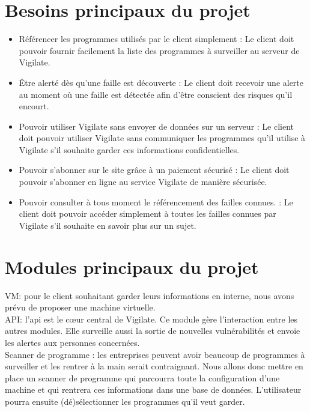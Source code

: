 \section{Besoins principaux du projet}
\begin{itemize}
\item Référencer les programmes utilisés par le client simplement : Le client doit pouvoir fournir facilement la liste des programmes à surveiller au serveur de Vigilate.
\item Être alerté dès qu'une faille est découverte : Le client doit recevoir une alerte au moment où une faille est détectée afin d'être conscient des risques qu'il encourt.
\item Pouvoir utiliser Vigilate sans envoyer de données sur un serveur : Le client doit pouvoir utiliser Vigilate sans communiquer les programmes qu'il utilise à Vigilate s'il souhaite garder ces informations confidentielles.
\item Pouvoir s'abonner sur le site grâce à un paiement sécurisé : Le client doit pouvoir s'abonner en ligne au service Vigilate de manière sécurisée.
\item Pouvoir consulter à tous moment le référencement des failles connues. : Le client doit pouvoir accéder simplement à toutes les failles connues par Vigilate s'il souhaite en savoir plus sur un sujet.
\end{itemize}

\section{Modules principaux du projet}
VM: pour le client souhaitant garder leurs informations en interne, nous avons prévu de proposer une machine virtuelle.\\

API: l'api est le c\oe{}ur central de Vigilate. Ce module gère l'interaction entre les autres modules. Elle surveille aussi la sortie de nouvelles vulnérabilités et envoie les alertes aux personnes concernées.\\

Scanner de programme : les entreprises peuvent avoir beaucoup de programmes à surveiller et les rentrer à la main serait contraignant. Nous allons donc mettre en place un scanner de programme qui parcourra toute la configuration d'une machine et qui rentrera ces informations dans une base de données. L'utilisateur pourra ensuite (dé)sélectionner les programmes qu'il veut garder.\\

